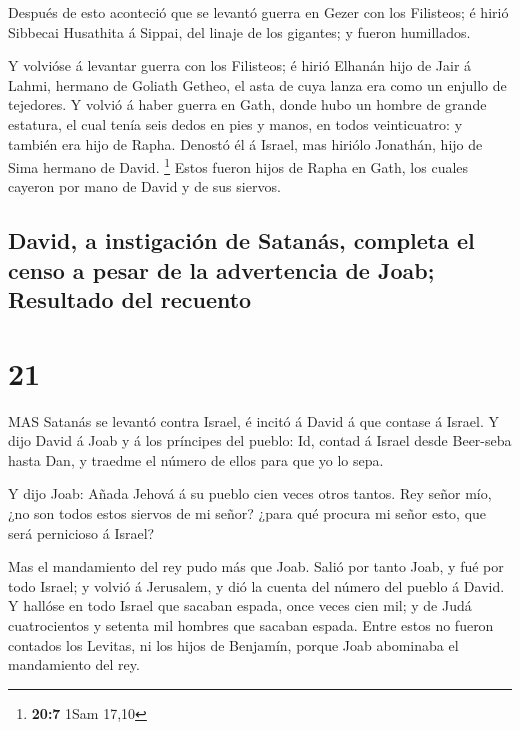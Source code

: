  Después de esto aconteció que se levantó guerra en Gezer
con los Filisteos; é hirió Sibbecai Husathita á Sippai, del linaje de
los gigantes; y fueron humillados.

 Y volvióse á levantar guerra con los Filisteos; é hirió
Elhanán hijo de Jair á Lahmi, hermano de Goliath Getheo, el asta de cuya
lanza era como un enjullo de tejedores.  Y volvió á haber
guerra en Gath, donde hubo un hombre de grande estatura, el cual tenía
seis dedos en pies y manos, en todos veinticuatro: y también era hijo de
Rapha.  Denostó él á Israel, mas hiriólo Jonathán, hijo de
Sima hermano de David. \footnote{\textbf{20:7} 1Sam 17,10} 
Estos fueron hijos de Rapha en Gath, los cuales cayeron por mano de
David y de sus siervos.

\hypertarget{david-a-instigaciuxf3n-de-satanuxe1s-completa-el-censo-a-pesar-de-la-advertencia-de-joab-resultado-del-recuento}{%
\subsection{David, a instigación de Satanás, completa el censo a pesar
de la advertencia de Joab; Resultado del
recuento}\label{david-a-instigaciuxf3n-de-satanuxe1s-completa-el-censo-a-pesar-de-la-advertencia-de-joab-resultado-del-recuento}}

\hypertarget{section-20}{%
\section{21}\label{section-20}}

 MAS Satanás se levantó contra Israel, é incitó á David á
que contase á Israel.  Y dijo David á Joab y á los príncipes
del pueblo: Id, contad á Israel desde Beer-seba hasta Dan, y traedme el
número de ellos para que yo lo sepa.

 Y dijo Joab: Añada Jehová á su pueblo cien veces otros
tantos. Rey señor mío, ¿no son todos estos siervos de mi señor? ¿para
qué procura mi señor esto, que será pernicioso á Israel?

 Mas el mandamiento del rey pudo más que Joab. Salió por
tanto Joab, y fué por todo Israel; y volvió á Jerusalem, y dió la cuenta
del número del pueblo á David.  Y hallóse en todo Israel que
sacaban espada, once veces cien mil; y de Judá cuatrocientos y setenta
mil hombres que sacaban espada.  Entre estos no fueron
contados los Levitas, ni los hijos de Benjamín, porque Joab abominaba el
mandamiento del rey.

